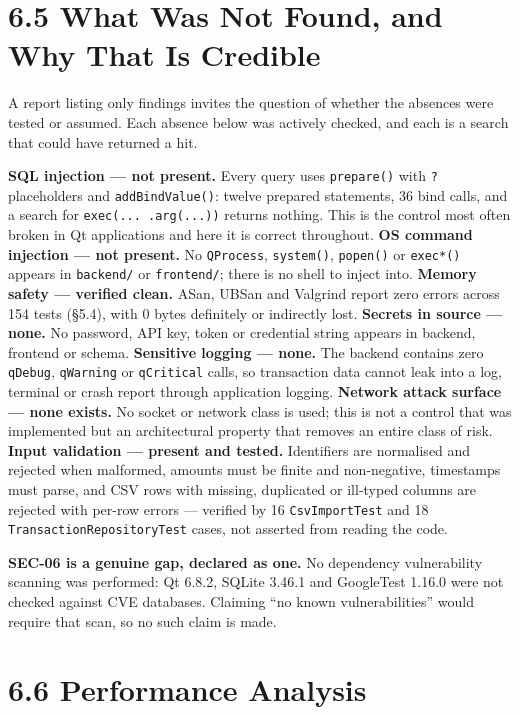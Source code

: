 \documentclass[
  12pt,
]{report}
\begin{document}
\section{6.5 What Was Not Found, and Why That Is
Credible}\label{what-was-not-found-and-why-that-is-credible}

A report listing only findings invites the question of whether the
absences were tested or assumed. Each absence below was actively
checked, and each is a search that could have returned a hit.

\textbf{SQL injection --- not present.} Every query uses
\texttt{prepare()} with \texttt{?} placeholders and
\texttt{addBindValue()}: twelve prepared statements, 36 bind calls, and
a search for \texttt{exec(...\ .arg(...))} returns nothing. This is the
control most often broken in Qt applications and here it is correct
throughout. \textbf{OS command injection --- not present.} No
\texttt{QProcess}, \texttt{system()}, \texttt{popen()} or
\texttt{exec*()} appears in \texttt{backend/\allowbreak{}} or \texttt{frontend/\allowbreak{}};
there is no shell to inject into. \textbf{Memory safety --- verified
clean.} ASan, UBSan and Valgrind report zero errors across 154 tests
(§5.4), with 0 bytes definitely or indirectly lost. \textbf{Secrets in
source --- none.} No password, API key, token or credential string
appears in backend, frontend or schema. \textbf{Sensitive logging ---
none.} The backend contains zero \texttt{qDebug}, \texttt{qWarning} or
\texttt{qCritical} calls, so transaction data cannot leak into a log,
terminal or crash report through application logging. \textbf{Network
attack surface --- none exists.} No socket or network class is used;
this is not a control that was implemented but an architectural property
that removes an entire class of risk. \textbf{Input validation ---
present and tested.} Identifiers are normalised and rejected when
malformed, amounts must be finite and non-negative, timestamps must
parse, and CSV rows with missing, duplicated or ill-typed columns are
rejected with per-row errors --- verified by 16 \texttt{CsvImportTest}
and 18 \texttt{Transaction\-Repository\-Test} cases, not asserted from
reading the code.

\textbf{SEC-06 is a genuine gap, declared as one.} No dependency
vulnerability scanning was performed: Qt 6.8.2, SQLite 3.46.1 and
GoogleTest 1.16.0 were not checked against CVE databases. Claiming ``no
known vulnerabilities'' would require that scan, so no such claim is
made.

\section{6.6 Performance Analysis}\label{performance-analysis}
\end{document}
